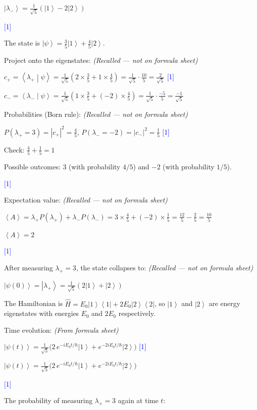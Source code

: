 \documentclass[12pt,a4paper]{article}
\newcommand{\markstep}[1]{\hfill\textcolor{blue}{[#1]}}
\newcommand{\finalanswer}[1]{%
  \begin{tcolorbox}[colback=green!5!white,colframe=green!50!black,boxrule=0.5pt]
  #1
  \end{tcolorbox}
}
\newcommand{\fromsheet}{\textit{(From formula sheet)}}
\newcommand{\recalled}{\textit{(Recalled --- not on formula sheet)}}
\renewcommand{\ket}[1]{\left|#1\right\rangle}
\renewcommand{\braket}[2]{\left\langle #1\middle|#2\right\rangle}
\renewcommand{\ketbra}[2]{\left|#1\right\rangle\!\left\langle #2\right|}
\renewcommand{\expect}[1]{\left\langle #1\right\rangle}
\begin{document}
\begin{parts}
\finalanswer{$\ket{\lambda_-} = \frac{1}{\sqrt{5}}(\ket{1} - 2\ket{2})$} \markstep{1}

\item The state is $\ket{\psi} = \frac{3}{5}\ket{1} + \frac{4}{5}\ket{2}$.

Project onto the eigenstates: \recalled

$c_+ = \braket{\lambda_+}{\psi} = \frac{1}{\sqrt{5}}\left(2\times\frac{3}{5} + 1\times\frac{4}{5}\right) = \frac{1}{\sqrt{5}}\cdot\frac{10}{5} = \frac{2}{\sqrt{5}}$ \markstep{1}

$c_- = \braket{\lambda_-}{\psi} = \frac{1}{\sqrt{5}}\left(1\times\frac{3}{5} + (-2)\times\frac{4}{5}\right) = \frac{1}{\sqrt{5}}\cdot\frac{-5}{5} = \frac{-1}{\sqrt{5}}$

Probabilities (Born rule): \recalled

$P(\lambda_+ = 3) = |c_+|^2 = \frac{4}{5}$, \quad $P(\lambda_- = -2) = |c_-|^2 = \frac{1}{5}$ \markstep{1}

Check: $\frac{4}{5} + \frac{1}{5} = 1$ \checkmark

\finalanswer{Possible outcomes: $3$ (with probability $4/5$) and $-2$ (with probability $1/5$).} \markstep{1}

Expectation value: \recalled

$\expect{A} = \lambda_+ P(\lambda_+) + \lambda_- P(\lambda_-) = 3\times\frac{4}{5} + (-2)\times\frac{1}{5} = \frac{12}{5} - \frac{2}{5} = \frac{10}{5}$

\finalanswer{$\expect{A} = 2$} \markstep{1}

\item After measuring $\lambda_+ = 3$, the state collapses to: \recalled

$\ket{\psi(0)} = \ket{\lambda_+} = \frac{1}{\sqrt{5}}(2\ket{1} + \ket{2})$

The Hamiltonian is $\hat{H} = E_0\ketbra{1}{1} + 2E_0\ketbra{2}{2}$, so $\ket{1}$ and $\ket{2}$ are energy eigenstates with energies $E_0$ and $2E_0$ respectively.

Time evolution: \fromsheet

$\ket{\psi(t)} = \frac{1}{\sqrt{5}}\bigl(2\,e^{-iE_0 t/\hbar}\ket{1} + e^{-2iE_0 t/\hbar}\ket{2}\bigr)$ \markstep{1}

\finalanswer{$\ket{\psi(t)} = \frac{1}{\sqrt{5}}\bigl(2\,e^{-iE_0 t/\hbar}\ket{1} + e^{-2iE_0 t/\hbar}\ket{2}\bigr)$} \markstep{1}

The probability of measuring $\lambda_+ = 3$ again at time $t$:


\end{parts}
\end{document}
